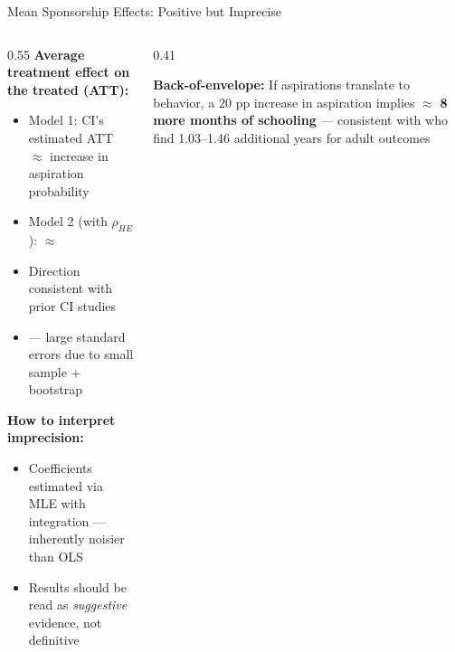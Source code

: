 \documentclass[aspectratio=169, 10pt]{beamer}
\begin{document}
\begin{frame}{Mean Sponsorship Effects: Positive but Imprecise}
  \begin{columns}
    \begin{column}{0.55\textwidth}
      \textbf{Average treatment effect on the treated (ATT):}
      \begin{itemize}
        \item Model 1: CI's estimated ATT $\approx$  increase in aspiration probability
        \item Model 2 (with $\rho_{HE}$): $\approx$ 
        \item Direction consistent with prior CI studies
        \item {} — large standard errors due to small sample + bootstrap
      \end{itemize}
      \vspace{0.5em}
      \textbf{How to interpret imprecision:}
      \begin{itemize}
        \item Coefficients estimated via MLE with integration — inherently noisier than OLS
        \item Results should be read as \textit{suggestive} evidence, not definitive
      \end{itemize}
    \end{column}
    \begin{column}{0.41\textwidth}
      \begin{resultbox}
        \textbf{Back-of-envelope:} If aspirations translate to behavior, a 20 pp increase in aspiration implies $\approx$ \textbf{8 more months of schooling} — consistent with \citet{Wydick2013} who find 1.03--1.46 additional years for adult outcomes
      \end{resultbox}
    \end{column}
  \end{columns}
\end{frame}
\end{document}
